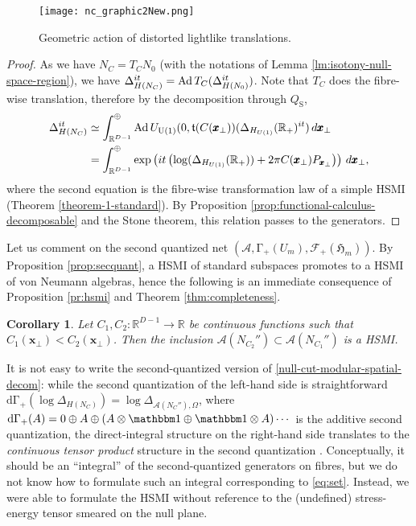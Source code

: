 \documentclass[12pt]{article}
\def\RR{{\mathbb R}}
\def\A{{\mathcal A}}
\def\hm{\mathfrak{H}_m}
\def\Ad{{\hbox{\rm Ad\,}}}
\def\1{{\mathbbm 1}}
\def\uone{{\rm U(1)}}
\newtheorem{corollary}[theorem]{Corollary}
\theoremstyle{remark}
\begin{document}
\begin{figure}[t]
	\centering
	\texttt{[image: nc\_graphic2New.png]}
	\caption{Geometric action of distorted lightlike translations.}
	\label{fig:modular-action}
\end{figure}
\begin{proof}
As we have $N_C = T_C N_0$ (with the notations of Lemma \ref{lm:isotony-null-space-region}),
we have $\Delta_{H(N_C)}^{it} = \Ad T_C (\Delta_{H(N_0)}^{it})$. Note that $T_C$ does the fibre-wise translation,
therefore by the decomposition through $Q_\mathrm{S}$,
\begin{align*}
 \Delta_{H(N_C)}^{it} &\simeq \int^\oplus_{\RR^{D-1}}
                                 \Ad U_{\uone}(0,\mathfrak{t}(C(\pmb{x}_\perp))(\Delta_{H_{U(1)}}(\RR_+)^{it}) \,d\pmb{x}_\perp\\
 &=\int^\oplus_{\RR^{D-1}}\exp\left(it\left(\log(\Delta_{H_{U(1)}}(\RR_+))+ 2\pi C(\pmb{x}_\perp) P_{\pmb{x}_\perp}\right)\right)\,d\pmb{x}_\perp,
\end{align*}
where the second equation is the fibre-wise transformation law of a simple HSMI (Theorem \ref{theorem-1-standard}).
By Proposition \ref{prop:functional-calculus-decomposable} and the Stone theorem,
this relation passes to the generators.

  

\end{proof}


Let us comment on the second quantized net $(\A, \mathrm{\Gamma}_+(U_m), \mathcal{F}_+(\hm))$.
By Proposition \ref{prop:secquant}, a HSMI of standard subspaces promotes to a HSMI of von Neumann algebras,
hence the following is an immediate consequence of Proposition \ref{pr:hsmi} and Theorem \ref{thm:completeness}.
\begin{corollary}
 Let $C_1, C_2:\RR^{D-1}\rightarrow \RR$ be continuous functions such that $C_1(\pmb{x}_\perp) < C_2(\pmb{x}_\perp)$.
Then the inclusion $\A(N_{C_2}'')\subset \A(N_{C_1}'')$ is a HSMI.   
\end{corollary}

It is not easy to write the second-quantized version of \eqref{null-cut-modular-spatial-decom}:
while the second quantization of the left-hand side is straightforward
$\mathrm{d\Gamma}_+(\log \Delta_{H(N_C)}) = \log \Delta_{\A(N_C''),\Omega}$,
where $\mathrm{d\Gamma}_+(A) = 0\oplus A \oplus (A\otimes \1 \oplus \1\otimes A)\cdots $ is the additive second quantization,
the direct-integral structure on the right-hand side translates to the \textit{continuous tensor product} structure
in the second quantization \cite{AW66, Napiorkowski71}.
Conceptually, it should be an ``integral'' of the second-quantized generators on fibres,
but we do not know how to formulate such an integral corresponding to \eqref{eq:set}.
Instead, we were able to formulate the HSMI without reference to the (undefined) stress-energy tensor
smeared on the null plane.
\end{document}
